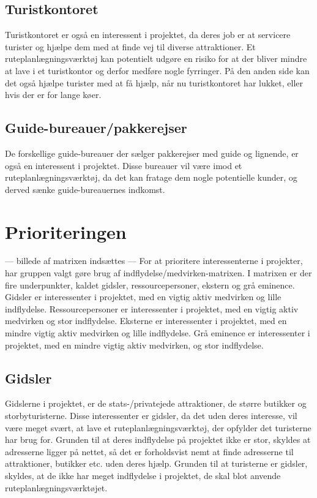 \subsection{Turistkontoret}
Turistkontoret er også en interessent i projektet, da deres job er at servicere turister og hjælpe dem med at finde vej til diverse attraktioner. Et ruteplanlægningsværktøj kan potentielt udgøre en risiko for at der bliver mindre at lave i et turistkontor og derfor medføre nogle fyrringer. På den anden side kan det også hjælpe turister med at få hjælp, når nu turistkontoret har lukket, eller hvis der er for lange køer. 

\subsection{Guide-bureauer/pakkerejser}
De forskellige guide-bureauer der sælger pakkerejser med guide og lignende, er også en interessent i projektet. Disse bureauer vil være imod et ruteplanlægningsværktøj, da det kan fratage dem nogle potentielle kunder, og derved sænke guide-bureauernes indkomst.   

\section{Prioriteringen}
--- billede af matrixen indsættes ---
For at prioritere interessenterne i projekter, har gruppen valgt gøre brug af indflydelse/medvirken-matrixen. I matrixen er der fire underpunkter, kaldet gidsler, ressourcepersoner, ekstern og grå eminence.
Gidsler er interessenter i projektet, med en vigtig aktiv medvirken og lille indflydelse. Ressourcepersoner er interessenter i projektet, med en vigtig aktiv medvirken og stor indflydelse. Eksterne er interessenter i projektet, med en mindre vigtig aktiv medvirken og lille indflydelse. Grå eminence er interessenter i projektet, med en mindre vigtig aktiv medvirken, og stor indflydelse.

\subsection{Gidsler}
Gidslerne i projektet, er de stats-/privatejede attraktioner, de større butikker og storbyturisterne.
Disse interessenter er gidsler, da det uden deres interesse, vil være meget svært, at lave et ruteplanlægningsværktøj, der opfylder det turisterne har brug for. Grunden til at deres indflydelse på projektet ikke er stor, skyldes at adresserne ligger på nettet, så det er forholdsvist nemt at finde adresserne til attraktioner, butikker etc. uden deres hjælp. Grunden til at turisterne er gidsler, skyldes, at de ikke har meget indflydelse i projektet, de skal blot anvende ruteplanlægningsværktøjet.

